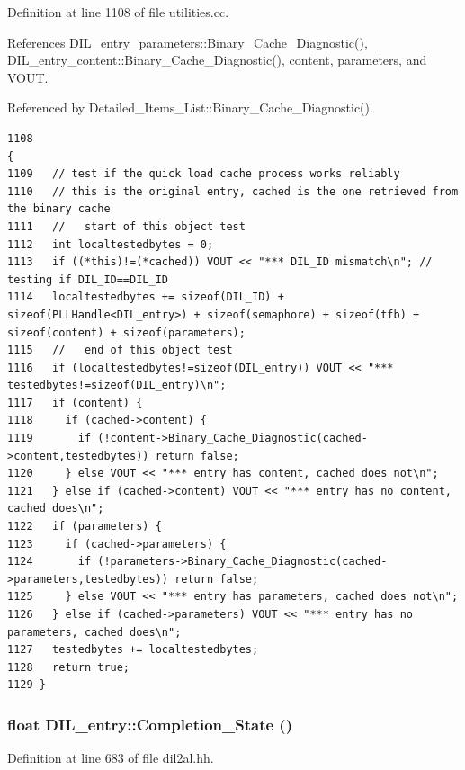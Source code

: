 Definition at line 1108 of file utilities.cc.

References DIL\_\-entry\_\-parameters::Binary\_\-Cache\_\-Diagnostic(), DIL\_\-entry\_\-content::Binary\_\-Cache\_\-Diagnostic(), content, parameters, and VOUT.

Referenced by Detailed\_\-Items\_\-List::Binary\_\-Cache\_\-Diagnostic().



\footnotesize\begin{verbatim}1108                                                                              {
1109   // test if the quick load cache process works reliably
1110   // this is the original entry, cached is the one retrieved from the binary cache
1111   //   start of this object test
1112   int localtestedbytes = 0;
1113   if ((*this)!=(*cached)) VOUT << "*** DIL_ID mismatch\n"; // testing if DIL_ID==DIL_ID
1114   localtestedbytes += sizeof(DIL_ID) + sizeof(PLLHandle<DIL_entry>) + sizeof(semaphore) + sizeof(tfb) + sizeof(content) + sizeof(parameters);
1115   //   end of this object test
1116   if (localtestedbytes!=sizeof(DIL_entry)) VOUT << "*** testedbytes!=sizeof(DIL_entry)\n";
1117   if (content) {
1118     if (cached->content) {
1119       if (!content->Binary_Cache_Diagnostic(cached->content,testedbytes)) return false;
1120     } else VOUT << "*** entry has content, cached does not\n";
1121   } else if (cached->content) VOUT << "*** entry has no content, cached does\n";
1122   if (parameters) {
1123     if (cached->parameters) {
1124       if (!parameters->Binary_Cache_Diagnostic(cached->parameters,testedbytes)) return false;
1125     } else VOUT << "*** entry has parameters, cached does not\n";
1126   } else if (cached->parameters) VOUT << "*** entry has no parameters, cached does\n";
1127   testedbytes += localtestedbytes;
1128   return true;
1129 }
\end{verbatim}\normalsize 
{}
\subsubsection{\setlength{\rightskip}{0pt plus 5cm}float DIL\_\-entry::Completion\_\-State ()\hspace{0.3cm}{\tt  [inline]}}\label{classDIL__entry_a15}




Definition at line 683 of file dil2al.hh.

